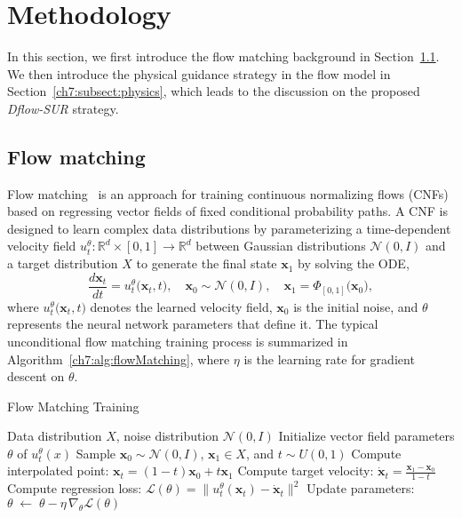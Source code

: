 \section{Methodology}
\label{ch7:sect:methodology}

In this section, we first introduce the flow matching background in Section~\ref{ch7:subsect:flowBackground}. We then introduce the physical guidance strategy in the flow model in Section~\ref{ch7:subsect:physics}, which leads to the discussion on the proposed \textit{Dflow-SUR} strategy.

\subsection{Flow matching}
\label{ch7:subsect:flowBackground}
Flow matching~\cite{ai.Lipman2022} is an approach for training continuous normalizing flows (CNFs) based on regressing vector fields of fixed conditional probability paths. A CNF is designed to learn complex data distributions by parameterizing a time-dependent velocity field $u_t^{\theta}:\mathbb{R}^d \times [0,1]\rightarrow \mathbb{R}^d$ between Gaussian distributions $\mathcal{N}(0, I)$ and a target distribution $X$ to generate the final state $\mathbf{x}_1$ by solving the ODE, 
\begin{equation}
    \frac{d \mathbf{x}_t}{d t}
    = u_t^{\theta}\bigl(\mathbf{x}_t, t\bigr), 
    \quad \mathbf{x}_0 \sim \mathcal{N}(0, I), 
    \quad \mathbf{x}_1 = \Phi_{[0,1]}\bigl(\mathbf{x}_0\bigr),
\end{equation}
where $u_t^{\theta}\bigl(\mathbf{x}_t, t\bigr)$ denotes the learned velocity field, $\mathbf{x}_0$ is the initial noise, and $\theta$ represents the neural network parameters that define it. The typical unconditional flow matching training process is summarized in Algorithm~\ref{ch7:alg:flowMatching}, where $\eta$ is the learning rate for gradient descent on $\theta$.

\begin{algorithm}
    \caption{Flow Matching Training}
    \label{ch7:alg:flow_matching}
    \begin{algorithmic}
        \Require Data distribution $X$, noise distribution $\mathcal{N}(0,I)$
        \State Initialize vector field parameters $\theta$ of $u_t^\theta(x)$
          \State Sample $\mathbf{x}_0\sim \mathcal{N}(0,I)$, $\mathbf{x}_1 \in X$, and $t \sim U(0,1)$
          \State Compute interpolated point:  $\mathbf{x}_t = (1-t)\mathbf{x}_0 + t\mathbf{x}_1$
          \State Compute target velocity:  $\dot{\mathbf{x}}_t = \frac{\mathbf{x}_1-\mathbf{x}_0}{1-t}$
          \State Compute regression loss:  $\mathcal{L}(\theta)=\bigl\|u_t^\theta(\mathbf{x}_t)-\dot{\mathbf{x}}_t\bigr\|^2$
          \State Update parameters: $\theta \;\gets\;\theta - \eta\,\nabla_\theta \mathcal{L}(\theta)$
        \EndFor
    \end{algorithmic}
    \label{ch7:alg:flowMatching}
\end{algorithm}


